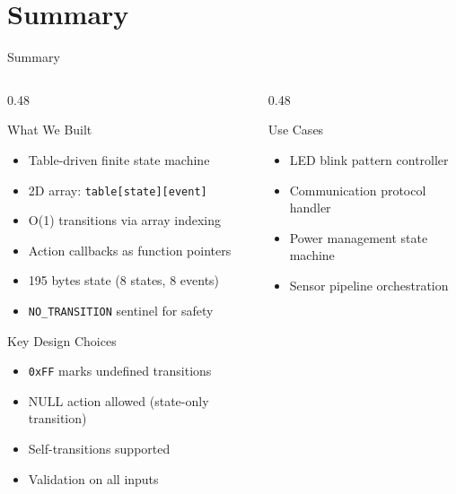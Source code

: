 \documentclass[aspectratio=169, 10pt]{beamer}
\begin{document}
\section{Summary}

\begin{frame}{Summary}
\begin{columns}[T]
\begin{column}{0.48\textwidth}
\begin{block}{What We Built}
\begin{itemize}
  \item Table-driven finite state machine
  \item 2D array: \texttt{table[state][event]}
  \item O(1) transitions via array indexing
  \item Action callbacks as function pointers
  \item 195 bytes state (8 states, 8 events)
  \item \texttt{NO\_TRANSITION} sentinel for safety
\end{itemize}
\end{block}

\begin{block}{Key Design Choices}
\begin{itemize}
  \item \texttt{0xFF} marks undefined transitions
  \item NULL action allowed (state-only transition)
  \item Self-transitions supported
  \item Validation on all inputs
\end{itemize}
\end{block}
\end{column}

\begin{column}{0.48\textwidth}
\begin{block}{Use Cases}
\begin{itemize}
  \item LED blink pattern controller
  \item Communication protocol handler
  \item Power management state machine
  \item Sensor pipeline orchestration
\end{itemize}
\end{block}


\end{column}
\end{columns}
\end{frame}
\end{document}
